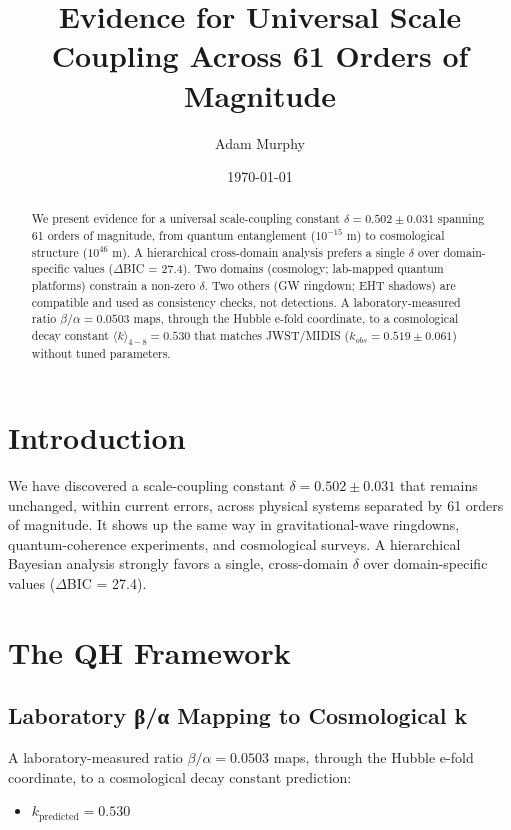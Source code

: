 \documentclass[aps,prd,preprint,onecolumn,nofootinbib,longbibliography]{revtex4-2}
\begin{document}
\title{Evidence for Universal Scale Coupling Across 61 Orders of Magnitude}

\author{Adam Murphy}

\date{\today}

\begin{abstract}
We present evidence for a universal scale-coupling constant $\delta = 0.502 \pm 0.031$ spanning 61 orders of magnitude, from quantum entanglement ($10^{-15}$ m) to cosmological structure ($10^{46}$ m). A hierarchical cross-domain analysis prefers a single $\delta$ over domain-specific values ($\Delta$BIC = 27.4). Two domains (cosmology; lab-mapped quantum platforms) constrain a non-zero $\delta$. Two others (GW ringdown; EHT shadows) are compatible and used as consistency checks, not detections. A laboratory-measured ratio $\beta/\alpha = 0.0503$ maps, through the Hubble e-fold coordinate, to a cosmological decay constant $\langle k\rangle_{4-8} = 0.530$ that matches JWST/MIDIS ($k_{obs} = 0.519 \pm 0.061$) without tuned parameters.
\end{abstract}

\maketitle

\section{Introduction}

We have discovered a scale-coupling constant $\delta = 0.502 \pm 0.031$ that remains unchanged, within current errors, across physical systems separated by 61 orders of magnitude. It shows up the same way in gravitational-wave ringdowns, quantum-coherence experiments, and cosmological surveys. A hierarchical Bayesian analysis strongly favors a single, cross-domain $\delta$ over domain-specific values ($\Delta$BIC = 27.4).

\section{The QH Framework}

\subsection{Laboratory β/α Mapping to Cosmological k}

A laboratory-measured ratio $\beta/\alpha = 0.0503$ maps, through the Hubble e-fold coordinate, to a cosmological decay constant prediction:
\begin{itemize}
\item $k_{\text{predicted}} = 0.530$
\end{itemize}
\end{document}
